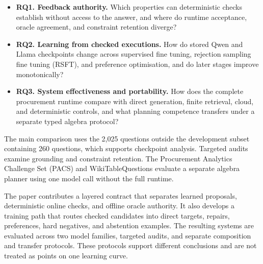 \begin{itemize}
  \item \textbf{RQ1. Feedback authority.} Which properties can deterministic checks establish
  without access to the answer, and where do runtime acceptance, oracle agreement, and constraint
  retention diverge?
  \item \textbf{RQ2. Learning from checked executions.} How do stored Qwen and Llama checkpoints
  change across supervised fine tuning, rejection sampling fine tuning (RSFT), and preference
  optimisation,
  and do later stages improve monotonically?
  \item \textbf{RQ3. System effectiveness and portability.} How does the complete procurement
  runtime compare with direct generation, finite retrieval, cloud, and deterministic controls, and
  what planning competence transfers under a separate typed algebra protocol?
\end{itemize}

The main comparison uses the 2,025 questions outside the development subset containing 260
questions, which supports checkpoint analysis.  Targeted audits examine grounding and constraint
retention.  The Procurement Analytics Challenge Set (PACS) and WikiTableQuestions evaluate a
separate algebra planner using one model call without the full runtime.

The paper contributes a layered contract that separates learned proposals, deterministic online
checks, and offline oracle authority.  It also develops a training path that routes checked
candidates into direct targets, repairs, preferences, hard negatives, and abstention examples.  The
resulting systems are evaluated across two model families, targeted audits, and separate
composition and transfer protocols.  These protocols support different conclusions and are not
treated as points on one learning curve.
